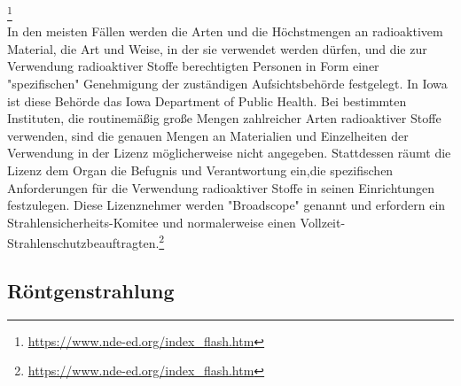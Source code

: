 \footnote[2]{\url{https://www.nde-ed.org/index_flash.htm}}\\
In den meisten Fällen werden die Arten und die Höchstmengen an radioaktivem Material, die Art und Weise, in der sie verwendet werden dürfen, und die zur Verwendung radioaktiver Stoffe berechtigten Personen in Form einer "spezifischen" Genehmigung der zuständigen Aufsichtsbehörde festgelegt. In Iowa ist diese Behörde das Iowa Department of Public Health. Bei bestimmten Instituten, die routinemäßig große Mengen zahlreicher Arten radioaktiver Stoffe verwenden, sind die genauen Mengen an Materialien und Einzelheiten der Verwendung in der Lizenz möglicherweise nicht angegeben. Stattdessen räumt die Lizenz dem Organ die Befugnis und Verantwortung ein,die spezifischen Anforderungen für die Verwendung radioaktiver Stoffe in seinen Einrichtungen festzulegen.
Diese Lizenznehmer werden "Broadscope" genannt und erfordern ein Strahlensicherheits-Komitee und normalerweise einen Vollzeit-Strahlenschutzbeauftragten.\footnote[3]{\url{https://www.nde-ed.org/index_flash.htm}}\\

\subsection{Röntgenstrahlung}

